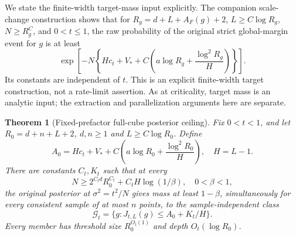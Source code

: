 \documentclass[11pt]{article}
\newtheorem{theorem}{Theorem}[section]
\theoremstyle{remark}
\begin{document}
We state the finite-width target-mass input explicitly.
The companion scale-change construction
\cite[Proposition \texttt{prop:long} and the Fourier-seed
section]{uniformtargets} shows that for
$R_g=d+L+A_F(g)+2$, $L\ge C\log R_g$, $N\ge R_g^C$,
and $0<t\le1$, the raw probability of the original strict
global-margin event for $g$ is at least
\begin{equation}
 \exp\left[-N\left\{
 Hc_t+V_*+C\left(a\log R_g+\frac{\log^2R_g}{H}\right)
 \right\}\right].
 \label{eq:prefactor-target-mass}
\end{equation}
Its constants are independent of $t$. This is an explicit
finite-width target construction, not a rate-limit assertion.
As at criticality, target mass is an analytic input; the
extraction and parallelization arguments here are separate.

\begin{theorem}[Fixed-prefactor full-cube posterior ceiling]
\label{thm:prefactor-ceiling}
Fix $0<t<1$, and let $R_0=d+n+L+2$, $d,n\ge1$ and
$L\ge C\log R_0$. Define
\[
 A_0=Hc_t+V_*+
 C\left(a\log R_0+\frac{\log^2R_0}{H}\right),\quad H=L-1.
\]
There are constants $C_t,K_t$ such that at every
\[
 N\ge2^{C_t d}R_0^{C_t}+C_tH\log(1/\beta),\quad0<\beta<1,
\]
the original posterior at $\sigma^2=t^2/N$ gives mass at least
$1-\beta$, simultaneously for every consistent sample of at
most $n$ points, to the sample-independent class
\[
 \mathcal G_t=\{g:J_{t,L}(g)\le A_0+K_t/H\}.
\]
Every member has threshold size $R_0^{O_t(1)}$ and depth
$O_t(\log R_0)$.
\end{theorem}
\end{document}

